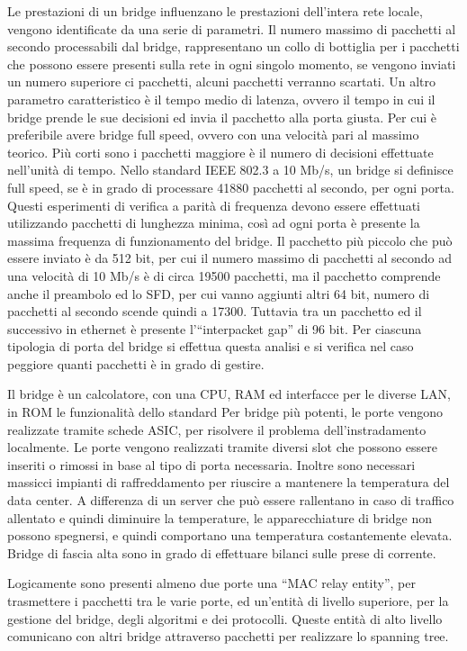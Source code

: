 \documentclass{article}
\numberwithin{equation}{subsection}
\begin{document}
Le prestazioni di un bridge influenzano le prestazioni dell'intera rete locale, vengono identificate da una serie di parametri. Il numero massimo di pacchetti al 
secondo processabili dal bridge, rappresentano un collo di bottiglia per i pacchetti che possono essere presenti sulla rete in ogni singolo momento, se vengono 
inviati un numero superiore ci pacchetti, alcuni pacchetti verranno scartati. Un altro parametro caratteristico è il tempo medio di latenza, ovvero il tempo in cui il 
bridge prende le sue decisioni ed invia il pacchetto alla porta giusta. 
Per cui è preferibile avere bridge full speed, ovvero con una velocità pari al massimo teorico. Più corti sono i pacchetti maggiore è il numero di decisioni 
effettuate nell'unità di tempo. Nello standard IEEE 802.3 a 10 Mb/s, un bridge si definisce full speed, se è in grado di processare 41880 pacchetti al secondo, 
per ogni porta. Questi esperimenti di verifica a parità di frequenza devono essere effettuati utilizzando pacchetti di lunghezza minima, così ad ogni porta è presente 
la massima frequenza di funzionamento del bridge. 
Il pacchetto più piccolo che può essere inviato è da 512 bit, per cui il numero massimo di pacchetti al secondo ad una 
velocità di 10 Mb/s è di circa 19500 pacchetti, ma il pacchetto comprende anche il preambolo ed lo SFD, per cui vanno aggiunti altri 64 bit, 
numero di pacchetti al secondo scende quindi a 17300. 
Tuttavia tra un pacchetto ed il successivo in ethernet è presente l'``interpacket gap'' di 96 bit. 
Per ciascuna tipologia di porta del bridge si effettua questa analisi e si verifica nel caso peggiore quanti pacchetti è in grado di gestire. 


Il bridge è un calcolatore, con una CPU, RAM ed interfacce per le diverse LAN, in ROM le funzionalità dello standard %
Per bridge più potenti, le  porte vengono realizzate tramite schede ASIC, per risolvere il problema dell'instradamento localmente. Le porte vengono realizzati tramite 
diversi slot che possono essere inseriti o rimossi in base al tipo di porta necessaria. Inoltre sono necessari massicci impianti di raffreddamento per riuscire a 
mantenere la temperatura del data center. A differenza di un server che può essere rallentano in caso di traffico allentato e quindi diminuire la temperature, le apparecchiature di bridge non possono 
spegnersi, e quindi comportano una temperatura costantemente elevata. Bridge di fascia alta sono in grado di effettuare bilanci sulle prese di corrente. 

Logicamente sono presenti almeno due porte una ``MAC relay entity'', per trasmettere i pacchetti tra le varie porte, ed un'entità di livello superiore, per la gestione 
del bridge, degli algoritmi e dei protocolli. Queste entità di alto livello comunicano con altri bridge attraverso pacchetti per realizzare lo spanning tree. 
\end{document}
